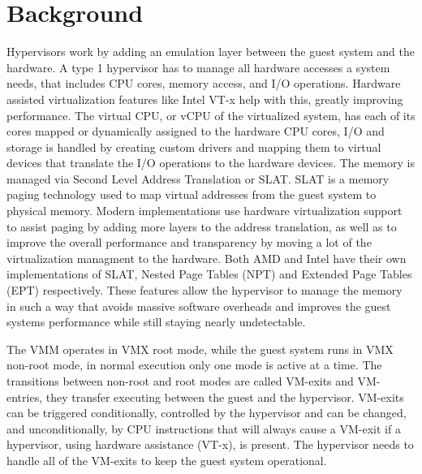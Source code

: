 \section{Background}\label{s:background}



Hypervisors work by adding an emulation layer between the guest system and the hardware. A type 1 hypervisor has to manage all hardware accesses a system needs, 
that includes CPU cores, memory access, and I/O operations. Hardware assisted virtualization features like Intel VT-x help with this, greatly improving performance. 
The virtual CPU, or vCPU of the virtualized system, has each of its cores mapped or dynamically assigned to the hardware CPU cores, 
I/O and storage is handled by creating custom drivers and mapping them to virtual devices that translate the I/O operations to the hardware devices. 
The memory is managed via Second Level Address Translation or SLAT. SLAT is a memory paging technology used to map virtual addresses from the guest system to physical memory. 
Modern implementations use hardware virtualization support to assist paging by adding more layers to the address translation, as well as 
to improve the overall performance and transparency by moving a lot of the virtualization managment to the hardware. 
Both AMD and Intel have their own implementations of SLAT, Nested Page Tables (NPT) and Extended Page Tables (EPT) respectively.
These features allow the hypervisor to manage the memory in such a way that avoids massive software overheads and improves the guest systems performance 
while still staying nearly undetectable. 

The VMM operates in VMX root mode, while the guest system runs in VMX non-root mode, in normal execution only one mode is active at a time. 
The transitions between non-root and root modes are called VM-exits and VM-entries, they transfer executing between the guest and the hypervisor. 
VM-exits can be triggered conditionally, controlled by the hypervisor and can be changed, and unconditionally, by CPU instructions that will always cause a VM-exit if a hypervisor, using hardware assistance (VT-x), is present. 
The hypervisor needs to handle all of the VM-exits to keep the guest system operational.


